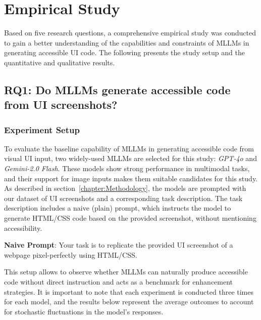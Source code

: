 \chapter{Empirical Study}\label{chapter:EmpiricalStudy}
Based on five research questions, a comprehensive empirical study 
was conducted to gain a better understanding of the 
capabilities and constraints of MLLMs in generating accessible UI code.
The following presents the study setup and the quantitative and
qualitative results.

\section{RQ1: Do MLLMs generate accessible code from UI screenshots?}
\subsection{Experiment Setup}
To evaluate the baseline capability of MLLMs in generating accessible
code from visual UI input, two widely-used MLLMs are 
selected for this study: \textit{GPT-4o} and \textit{Gemini-2.0 Flash}.
These models show strong performance in 
multimodal tasks, and their support for image inputs makes
them suitable candidates for this study.\newline
As described in section~\ref{chapter:Methodology}, the models are 
prompted with our dataset of UI screenshots and a corresponding 
task description. The task description includes a naive (plain)
prompt, which instructs the model to generate HTML/CSS code
based on the provided screenshot, without mentioning accessibility.


\begin{roundedbox}
\textbf{Naive Prompt}: Your task is to replicate 
the provided UI screenshot of a webpage pixel-perfectly using 
HTML/CSS.
\end{roundedbox}

This setup allows to observe whether MLLMs can 
naturally produce accessible code without direct instruction 
and acts as a benchmark for enhancement strategies. 
It is important to note that each experiment is conducted three 
times for each model, and the results below represent the average 
outcomes to account for stochastic fluctuations in the model's responses.


